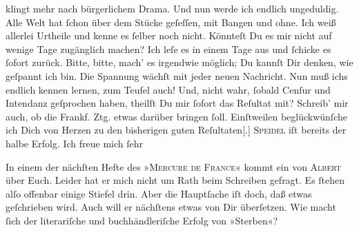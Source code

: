                klingt mehr nach bürgerlichem Drama. Und nun werde ich endlich ungeduldig. Alle Welt
               hat ſchon über dem Stücke
               geſeſſen, mit  Bangen und ohne. Ich weiß allerlei
               Urtheile und kenne es ſelber noch nicht. Könnteſt Du es mir nicht auf wenige Tage
               zugänglich machen? Ich leſe es in einem Tage aus und ſchicke es ſofort zurück. Bitte,
               bitte, mach’ es irgendwie möglich; Du kannſt Dir denken, wie geſpannt {\pb}ich bin. Die Spannung wächſt mit jeder neuen
               Nachricht. Nun muß ichs endlich kennen lernen, zum Teufel auch! Und, nicht wahr,
               ſobald Cenſur und Intendanz geſprochen haben, theilſt Du mir ſofort das Reſultat mit?
               Schreib’ mir auch, ob die Frankf. Ztg. etwas
               darüber bringen ſoll. Einſtweilen beglückwünſche ich Dich von Herzen zu den
               bisherigen guten Reſultaten{[}.{]}{ }\textsc{Speidel} iſt bereits der halbe Erfolg. Ich freue mich ſehr{\dotsfive}\pend
           
\pstart
           In einem der nächſten Hefte des »\textsc{Mercure de France}« kommt ein \label{K_L02630-5v}\label{K_L02630-5} von \textsc{Albert} über Euch. Leider hat er mich nicht um Rath {\pb}beim Schreiben gefragt. Es ſtehen alſo offenbar einige Stiefel drin. Aber die
               Hauptſache iſt doch, daß etwas geſchrieben wird. Auch will er nächſtens etwas von Dir
               überſetzen. Wie macht ſich der literariſche und buchhändleriſche Erfolg von »Sterben«?\pend
           

